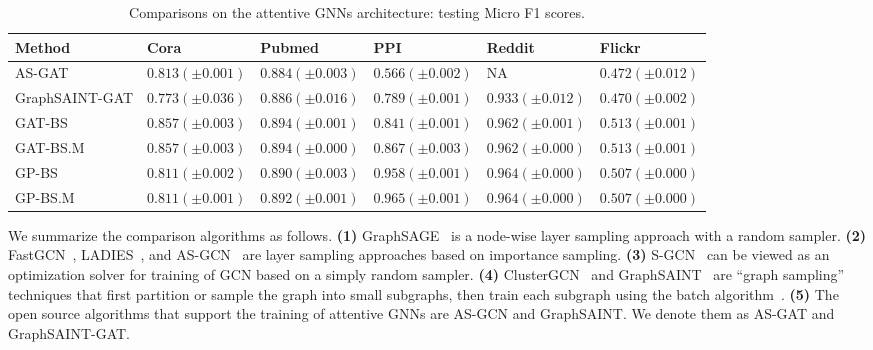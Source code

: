 \documentclass{article}
\begin{document}
{\tiny
\begin{table*}[h]
\caption{Comparisons on the attentive GNNs architecture: testing Micro F1 scores.}
\label{tb:bench-gat}
\begin{center}
\begin{tabular}{llllll}
\toprule
\textbf{Method}  &\textbf{Cora} &\textbf{Pubmed} &\textbf{PPI}& \textbf{Reddit}& \textbf{Flickr} \\
\midrule
AS-GAT & $0.813 (\pm 0.001)$ &$0.884 (\pm 0.003)$ & $0.566(\pm 0.002)$ & NA & $0.472 (\pm 0.012)$ \\
GraphSAINT-GAT & $0.773 (\pm 0.036)$ &$0.886 (\pm 0.016)$ & $0.789(\pm 0.001)$ & $0.933 (\pm 0.012)$ & $0.470 (\pm 0.002)$ \\
\midrule
GAT-BS & $\bm{0.857} (\pm 0.003)$ &$\bm{0.894} (\pm 0.001)$ & $0.841(\pm 0.001)$ & $0.962 (\pm 0.001)$ & $\bm{0.513} (\pm 0.001)$ \\
GAT-BS.M & $\bm{0.857} (\pm 0.003)$ &$\bm{0.894} (\pm 0.000)$ & $0.867(\pm 0.003)$ & $0.962 (\pm 0.000)$ & $\bm{0.513} (\pm 0.001)$ \\
GP-BS & $0.811 (\pm 0.002)$ &$0.890 (\pm 0.003)$ & ${0.958}(\pm 0.001)$ & $\bm{0.964} (\pm 0.000)$ & $0.507 (\pm 0.000)$ \\
GP-BS.M & $0.811 (\pm 0.001)$ &$0.892 (\pm 0.001)$ & $\bm{0.965}(\pm 0.001)$ & $\bm{0.964} (\pm 0.000)$ & $0.507 (\pm 0.000)$ \\
\bottomrule
\end{tabular}
\end{center}
\end{table*}
\vspace{-0.1cm}
}

We summarize the comparison algorithms as follows.
\textbf{(1)} GraphSAGE~\cite{hamilton2017inductive} is
a node-wise layer sampling approach with a random 
sampler.
\textbf{(2)} FastGCN~\cite{chen2018fastgcn}, 
LADIES~\cite{zou2019layer}, and 
AS-GCN~\cite{huang2018adaptive} are
layer sampling approaches based on importance sampling.
\textbf{(3)} S-GCN~\cite{chen2017stochastic} can be 
viewed as an optimization solver for training of 
GCN based on a simply random sampler.
\textbf{(4)} ClusterGCN~\cite{chiang2019cluster} and
GraphSAINT~\cite{zeng2019graphsaint} are 
``graph sampling'' techniques that first partition 
or sample the graph into small subgraphs, then train 
each subgraph using the batch algorithm~\cite{kipf2016semi}.
\textbf{(5)} The open source algorithms that support the training
of attentive GNNs are AS-GCN and GraphSAINT. We denote
them as AS-GAT and GraphSAINT-GAT.
\end{document}
